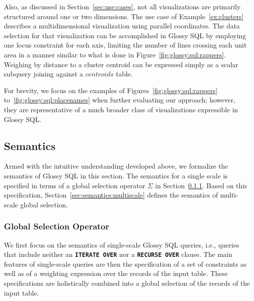 \documentclass[11pt, oneside]{report}
\begin{document}
Also, as discussed in Section~\ref{sec:use:cases}, not all visualizations are primarily structured around one or two dimensions. The use case of Example~\ref{ex:clusters} describes a multidimensional visualization using parallel coordinates. The data selection for that visualization can be accomplished in Glossy SQL by employing one locus constraint for each axis, limiting the number of lines crossing each unit area in a manner similar to what is done in Figure~\ref{fig:glossy:sql:rappers}. Weighing by distance to a cluster centroid can be expressed simply as a scalar subquery joining against a $centroids$ table. 

For brevity, we focus on the examples of Figures~\ref{fig:glossy:sql:rappers} to~\ref{fig:glossy:sql:placenames} when further evaluating our approach; however, they are representative of a much broader class of visualizations expressible in Glossy SQL.    

\subsection{Semantics}
\label{sec:semantics}


Armed with the intuitive understanding developed above, we formalize the semantics of Glossy SQL in this section. The semantics for a single scale is specified in terms of a global selection operator $\Sigma$ in Section~\ref{sec:semantics:global:selection}. Based on this specification, Section~\ref{sec:semantics:multiscale} defines the semantics of multi-scale global selection.

\subsubsection{Global Selection Operator}
\label{sec:semantics:global:selection}

We first focus on the semantics of single-scale Glossy SQL queries, i.e., queries that include neither an \textbf{\texttt{ITERATE OVER}} nor a \textbf{\texttt{RECURSE OVER}} clause. The main features of single-scale queries are then the specification of a set of constraints as well as of a weighting expression over the records of the input table. These specifications are holistically combined into a global selection of the records of the input table.
\end{document}
